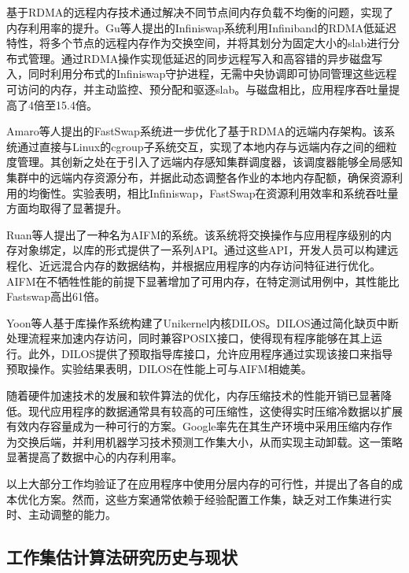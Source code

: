 基于RDMA的远程内存技术通过解决不同节点间内存负载不均衡的问题，实现了内存利用率的提升。Gu等人提出的Infiniswap系统利用Infiniband的RDMA低延迟特性，将多个节点的远程内存作为交换空间，并将其划分为固定大小的slab进行分布式管理。通过RDMA操作实现低延迟的同步远程写入和高容错的异步磁盘写入，同时利用分布式的Infiniswap守护进程，无需中央协调即可协同管理这些远程可访问的内存，并主动监控、预分配和驱逐slab。与磁盘相比，应用程序吞吐量提高了4倍至15.4倍。

Amaro等人提出的FastSwap系统进一步优化了基于RDMA的远端内存架构。该系统通过直接与Linux的cgroup子系统交互，实现了本地内存与远端内存之间的细粒度管理。其创新之处在于引入了远端内存感知集群调度器，该调度器能够全局感知集群中的远端内存资源分布，并据此动态调整各作业的本地内存配额，确保资源利用的均衡性。实验表明，相比Infiniswap，FastSwap在资源利用效率和系统吞吐量方面均取得了显著提升。

Ruan等人\cite{ruan2020aifm}提出了一种名为AIFM的系统。该系统将交换操作与应用程序级别的内存对象绑定，以库的形式提供了一系列API。通过这些API，开发人员可以构建远程化、近远混合内存的数据结构，并根据应用程序的内存访问特征进行优化。AIFM在不牺牲性能的前提下显著增加了可用内存，在特定测试用例中，其性能比Fastswap\cite{10.1145/3342195.3387522}高出61倍。

Yoon等人\cite{yoon2021dilos,yoon2023dilos}基于库操作系统构建了Unikernel内核DILOS。DILOS通过简化缺页中断处理流程来加速内存访问，同时兼容POSIX接口，使得现有程序能够在其上运行。此外，DILOS提供了预取指导库接口，允许应用程序通过实现该接口来指导预取操作。实验结果表明，DILOS在性能上可与AIFM\cite{ruan2020aifm}相媲美。

随着硬件加速技术的发展和软件算法的优化\cite{10.1145/3620666.3651323}，内存压缩技术的性能开销已显著降低。现代应用程序的数据通常具有较高的可压缩性，这使得实时压缩冷数据以扩展有效内存容量成为一种可行的方案。Google\cite{10.1145/3297858.3304053}率先在其生产环境中采用压缩内存作为交换后端，并利用机器学习技术预测工作集大小，从而实现主动卸载。这一策略显著提高了数据中心的内存利用率。

以上大部分工作\cite{10.1145/3132402.3132409,201565,10.1145/3342195.3387522,ruan2020aifm,yoon2021dilos,yoon2023dilos}均验证了在应用程序中使用分层内存的可行性，并提出了各自的成本优化方案。然而，这些方案通常依赖于经验配置工作集，缺乏对工作集进行实时、主动调整的能力。

\subsection{工作集估计算法研究历史与现状}


